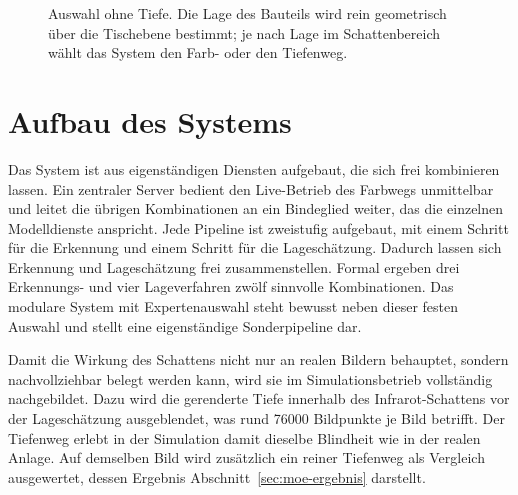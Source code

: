 \documentclass[oneside,studentpaper]{wbk}
\begin{document}
\begin{figure}[H]
\centering
{}
\caption{Auswahl ohne Tiefe. Die Lage des Bauteils wird rein geometrisch über die
Tischebene bestimmt; je nach Lage im Schattenbereich wählt das System den Farb-
oder den Tiefenweg.}
\label{fig:moe-arch}
\end{figure}

\section{Aufbau des Systems}
\label{sec:impl}

Das System ist aus eigenständigen Diensten aufgebaut, die sich frei kombinieren
lassen. Ein zentraler Server bedient den Live-Betrieb des Farbwegs unmittelbar und
leitet die übrigen Kombinationen an ein Bindeglied weiter, das die einzelnen
Modelldienste anspricht. Jede Pipeline ist zweistufig aufgebaut, mit einem Schritt
für die Erkennung und einem Schritt für die Lageschätzung. Dadurch lassen sich
Erkennung und Lageschätzung frei zusammenstellen. Formal ergeben drei
Erkennungs- und vier Lageverfahren zwölf sinnvolle Kombinationen. Das modulare
System mit Expertenauswahl steht bewusst neben dieser festen Auswahl und stellt
eine eigenständige Sonderpipeline dar.

Damit die Wirkung des Schattens nicht nur an realen Bildern behauptet, sondern
nachvollziehbar belegt werden kann, wird sie im Simulationsbetrieb vollständig
nachgebildet. Dazu wird die gerenderte Tiefe innerhalb des Infrarot-Schattens vor
der Lageschätzung ausgeblendet, was rund 76000 Bildpunkte je Bild betrifft. Der
Tiefenweg erlebt in der Simulation damit dieselbe Blindheit wie in der realen
Anlage. Auf demselben Bild wird zusätzlich ein reiner Tiefenweg als Vergleich
ausgewertet, dessen Ergebnis Abschnitt~\ref{sec:moe-ergebnis} darstellt.
\end{document}
